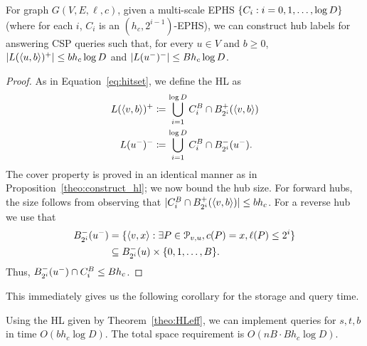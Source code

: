 \begin{theorem}
\label{theo:HLeff}
For graph $G(V,E,\ell,c)$, given a multi-scale EPHS $\crl*{C_i:i=0,1,\ldots,\log D}$ (where for each $i$, $C_i$ is an $(h_c,2^{i-1})$-EPHS), we can construct hub labels for answering CSP queries such that, for every $u\in V$ and $b\geq 0$, $\card{L(\pp{u,b})^+}\leq bh_c\log D$ and $\card{L(u^-)^-}\leq Bh_c\log D$. 
\end{theorem}
\begin{proof}
As in Equation~\eqref{eq:hitset}, we define the HL as
\begin{align*}
L(\pp{v,b})^+ &\defeq \bigcup_{i=1}^{\log D} C_i^B\cap \Bf_{2^i}(\pp{v,b})\\
L(u^-)^-  &\defeq \bigcup_{i=1}^{\log D} C_i^B\cap \Bb_{2^i}(u^-).
\end{align*}
The cover property is proved in an identical manner as in Proposition~\ref{theo:construct_hl}; we now bound the hub size.
For forward hubs, the size follows from observing that $ \card{C_i^B\cap \Bf_{2^i}(\pp{v,b})}\leq bh_c$.
For a reverse hub we use that
\begin{align*}
\Bb_{2^i}(u^-) &= \{\pp{v,x}: \exists P\in \calP_{v,u}, c(P)=x, \ell(P)\leq 2^i\}\\
&\subseteq \Bb_{2^i}(u)\times \{0,1,\ldots,B\}.
\end{align*}
Thus, $\Bb_{2^i}(u^-)\cap C_i^B\leq Bh_c$.
\end{proof}

This immediately gives us the following corollary for the storage and query time.
\begin{corollary}
Using the HL given by Theorem~\ref{theo:HLeff}, we can implement queries for $s,t,b$ in time $O(b h_c\log D)$.
The total space requirement is $O(nB \cdot Bh_c\log D)$.
\end{corollary}


